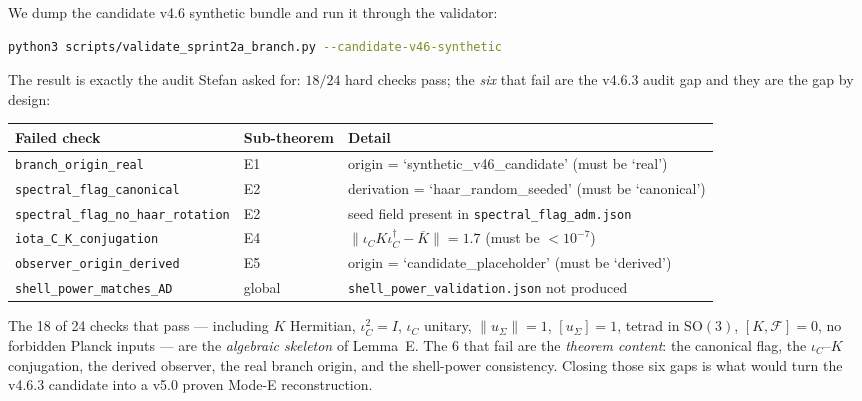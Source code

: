 We dump the candidate v4.6 synthetic bundle and run it through the
validator:
\begin{lstlisting}[language=bash]
python3 scripts/validate_sprint2a_branch.py --candidate-v46-synthetic
\end{lstlisting}
The result is exactly the audit Stefan asked for: \(18/24\) hard
checks pass; the \emph{six} that fail are the v4.6.3 audit gap and
they are the gap by design:

\begin{center}
\renewcommand{\arraystretch}{1.13}
\begin{tabularx}{\textwidth}{@{}lp{}Y@{}}
\toprule
\textbf{Failed check} & \textbf{Sub-theorem} & \textbf{Detail} \\
\midrule
\texttt{branch\_origin\_real} & E1 & origin = `synthetic\_v46\_candidate' (must be `real') \\
\texttt{spectral\_flag\_canonical} & E2 & derivation = `haar\_random\_seeded' (must be `canonical') \\
\texttt{spectral\_flag\_no\_haar\_rotation} & E2 & seed field present in \texttt{spectral\_flag\_adm.json} \\
\texttt{iota\_C\_K\_conjugation} & E4 & \(\|\iota_C K \iota_C^\dagger - \overline{K}\|=1.7\) (must be \(<10^{-7}\)) \\
\texttt{observer\_origin\_derived} & E5 & origin = `candidate\_placeholder' (must be `derived') \\
\texttt{shell\_power\_matches\_AD} & global & \texttt{shell\_power\_validation.json} not produced \\
\bottomrule
\end{tabularx}
\end{center}

\begin{tfptfrontbox}
The 18 of 24 checks that pass --- including \(K\) Hermitian,
\(\iota_C^2=I\), \(\iota_C\) unitary, \(\|u_\Sigma\|=1\),
\([u_\Sigma]=1\), tetrad in \(\mathrm{SO}(3)\), \([K, \mathcal F]=0\),
no forbidden Planck inputs --- are the \emph{algebraic skeleton} of
Lemma~E.  The 6 that fail are the \emph{theorem content}: the canonical
flag, the \(\iota_C\)--\(K\) conjugation, the derived observer, the
real branch origin, and the shell-power consistency.  Closing those
six gaps is what would turn the v4.6.3 candidate into a v5.0 proven
Mode-E reconstruction.
\end{tfptfrontbox}

